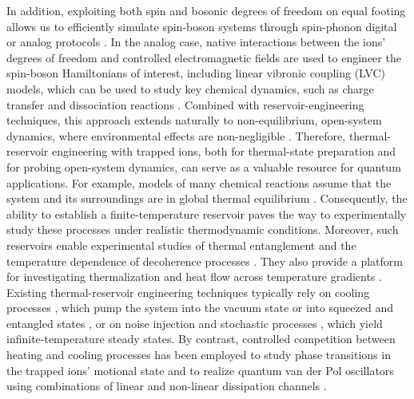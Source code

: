 \documentclass[%
reprint,
superscriptaddress,
amsmath,amssymb,
aps,
prl,
floatfix,
]{revtex4-2}
\begin{document}
In addition, exploiting both spin and bosonic degrees of freedom on equal footing allows us to efficiently simulate spin-boson systems through spin-phonon digital \cite{zohreh2021spinphonon,than2025spinphonon} or analog protocols \cite{zahringer2010walk,clos2016thermalization,lv2018rabi,cai2021rabi,mei2022rabihubbard,muralidharan2023jch}. In the analog case, native interactions between the ions’ degrees of freedom and controlled electromagnetic fields are used to engineer the spin-boson Hamiltonians of interest, including linear vibronic coupling (LVC) models, which can be used to study key chemical dynamics, such as charge transfer and dissociation reactions \cite{gorman2018VAET,valahu2023conical,whitlow2023conical,macdonell2023timedomain}.
Combined with reservoir-engineering techniques, this approach extends naturally to non-equilibrium, open-system dynamics, where environmental effects are non-negligible \cite{kang2024chemical,olaya-agudelo2025open,pagano2025varenna}. Therefore, thermal-reservoir engineering with trapped ions, both for thermal-state preparation and for probing open-system dynamics, can serve as a valuable resource for quantum applications. For example, models of many chemical reactions assume that the system and its surroundings are in global thermal equilibrium \cite{laidler1987kinetics,truhlar1996TST,petruccione2007}. Consequently, the ability to establish a finite-temperature reservoir paves the way to experimentally study these processes under realistic thermodynamic conditions. Moreover, such reservoirs enable experimental studies of thermal entanglement and the temperature dependence of decoherence processes \cite{fedortchenko2014finitetemp,wu2017coherence}. They also provide a platform for investigating thermalization and heat flow across temperature gradients \cite{lin2011thermalization}. Existing thermal-reservoir engineering techniques typically rely on cooling processes \cite{poyatos1996cooling,so2024electrontransfer,so2025multimode,kienzler2015thesis,cetina2022cooling}, which pump the system into the vacuum state \cite{Monroe1995a} or into squeezed and entangled states \cite{carvalho2001stateprotect,kienzler2015reservoir,zhu2025dissipation,li2025entanglement}, or on noise injection \cite{myatt2000decoherence,navickas2025chemical} and stochastic processes \cite{sun2025quantum}, which yield infinite-temperature steady states. By contrast, controlled competition between heating and cooling processes has been employed to study phase transitions in the trapped ions’ motional state \cite{behrle2023phononlaser} and to realize quantum van der Pol oscillators using combinations of linear and non-linear dissipation channels \cite{li2025vanderpol}.
\end{document}
